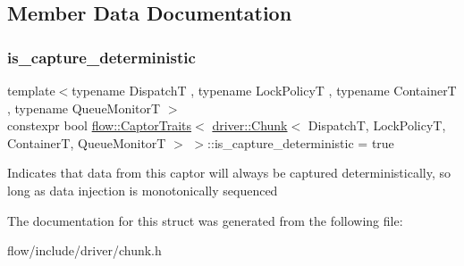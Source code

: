 \subsection{Member Data Documentation}
\mbox{\label{structflow_1_1_captor_traits_3_01driver_1_1_chunk_3_01_dispatch_t_00_01_lock_policy_t_00_01_contf25136d799b84e6e744301cf371fdfc2_ada5c859ac589ebdf628e3f687e43e188}} 
\subsubsection{\texorpdfstring{is\+\_\+capture\+\_\+deterministic}{is\_capture\_deterministic}}
{\footnotesize\ttfamily template$<$typename DispatchT , typename Lock\+PolicyT , typename ContainerT , typename Queue\+MonitorT $>$ \\
constexpr bool \hyperlink{structflow_1_1_captor_traits}{flow\+::\+Captor\+Traits}$<$ \hyperlink{classflow_1_1driver_1_1_chunk}{driver\+::\+Chunk}$<$ DispatchT, Lock\+PolicyT, ContainerT, Queue\+MonitorT $>$ $>$\+::is\+\_\+capture\+\_\+deterministic = true\hspace{0.3cm}{\ttfamily [static]}}

Indicates that data from this captor will always be captured deterministically, so long as data injection is monotonically sequenced 

The documentation for this struct was generated from the following file\+:\begin{DoxyCompactItemize}
\item 
flow/include/driver/chunk.\+h\end{DoxyCompactItemize}
